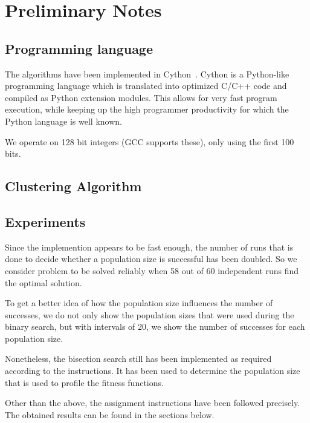 \documentclass[12pt]{article}
\theoremstyle{definition}
\begin{document}
\maketitle

\section*{Preliminary Notes}

\subsection*{Programming language}
The algorithms have been implemented in Cython~\cite{cython}.
Cython is a Python-like programming language which is translated into optimized
C/C++ code and compiled as Python extension modules.
This allows for very fast program execution, while keeping up the high programmer
productivity for which the Python language is well known.

We operate on 128 bit integers (GCC supports these), only using the first 100 bits.

\subsection*{Clustering Algorithm}

\subsection*{Experiments}
Since the implemention appears to be fast enough, the number of runs that is done to decide whether a population size is successful has been doubled.
So we consider problem to be solved reliably when 58 out of 60 independent runs find the optimal solution.

To get a better idea of how the population size influences the number of successes, we do not only show the population sizes that were used during the binary search, but with intervals of 20, we show the number of successes for each population size.

Nonetheless, the bisection search still has been implemented as required according to the instructions.
It has been used to determine the population size that is used to profile the fitness functions.

Other than the above, the assignment instructions have been followed precisely.
The obtained results can be found in the sections below.
\end{document}
